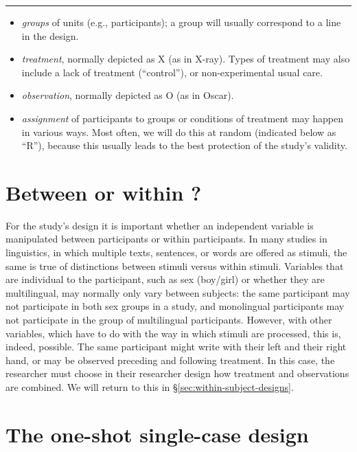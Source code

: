 \documentclass[
]{book}
\begin{document}
\begin{center}\rule{0.5\linewidth}{0.5pt}\end{center}

\begin{itemize}
\item
  \emph{groups} of units (e.g., participants); a group will usually correspond to a line in the design.
\item
  \emph{treatment}, normally depicted as X (as in X-ray). Types of treatment may also include a lack of treatment (``control''), or non-experimental usual care.
\item
  \emph{observation}, normally depicted as O (as in Oscar).
\item
  \emph{assignment} of participants to groups or conditions of treatment may happen in various ways. Most often, we will do this at random (indicated below as ``R''), because this usually leads to the best protection of the study's validity.
\end{itemize}

\hypertarget{sec:betweenwithinparticipants}{%
\section{Between or within ?}\label{sec:betweenwithinparticipants}}

For the study's design it is important whether an independent variable is manipulated between participants or within participants. In many studies in linguistics, in which multiple texts, sentences, or words are offered as stimuli, the same is true of distinctions between stimuli versus within stimuli. Variables that are individual to the participant, such as sex (boy/girl) or whether they are multilingual, may normally only vary between subjects: the same participant may not participate in both sex groups in a study, and monolingual participants may not participate in the group of multilingual participants. However, with other variables, which have to do with the way in which stimuli are processed, this is, indeed, possible. The same participant might write with their left and their right hand, or may be observed preceding and following treatment. In this case, the researcher must choose in their researcher design how treatment and observations are combined. We will return to this in §\ref{sec:within-subject-designs}.

\hypertarget{sec:one-shot-single-case-design}{%
\section{The one-shot single-case design}\label{sec:one-shot-single-case-design}}
\end{document}
